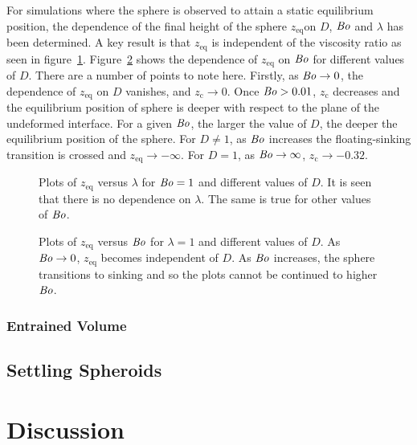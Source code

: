 \documentclass[12pt]{article}
\newcommand\Bo{\mbox{\textit{Bo}}}  %
\begin{document}
For simulations where the sphere is observed to attain a static equilibrium position, the dependence of the final height of the sphere $z_{\text{eq}}$on $D$, $\Bo$ and $\lambda$ has been determined. A key result is that $z_{\text{eq}}$ is independent of the viscosity ratio as seen in figure~\ref{fig:fin_pos_viscos}. Figure~\ref{fig:fin_pos} shows the dependence of $z_{\text{eq}}$ on $\Bo$ for different values of $D$. There are a number of points to note here. Firstly, as $\Bo \to 0$, the dependence of $z_{\text{eq}}$ on $D$ vanishes, and $z_{\text{c}} \to 0$. Once $\Bo > 0.01$, $z_{\text{c}}$ decreases and the equilibrium position of sphere is deeper with respect to the plane of the undeformed interface. For a given $\Bo$, the larger the value of $D$, the deeper the equilibrium position of the sphere. For $D \neq 1$, as $\Bo$ increases the floating-sinking transition is crossed and $z_{\text{eq}} \to -\infty$. For $D = 1$, as $\Bo \to \infty$, $z_{\text{c}} \to -0.32$. 

  \begin{figure}
    \resizebox{0.9\textwidth}{!}{\large }
    \caption{Plots of $z_{\text{eq}}$ versus $\lambda$ for $\Bo = 1$ and different values of $D$. It is seen that there is no dependence on $\lambda$. The same is true for other values of $\Bo$. \label{fig:fin_pos_viscos}}
  \end{figure}

  \begin{figure}
    \resizebox{0.9\textwidth}{!}{\large }
    \caption{Plots of $z_{\text{eq}}$ versus $\Bo$ for $\lambda = 1$ and different values of $D$. As $\Bo \to 0$, $z_{\text{eq}}$ becomes independent of $D$. As $\Bo$ increases, the sphere transitions to sinking and so the plots cannot be continued to higher $\Bo$. \label{fig:fin_pos}}
  \end{figure}

\subsubsection{Entrained Volume}
\label{subsubsec:ent_vol_res}


\subsection{Settling Spheroids}
\label{subsec:spheroids}


\section{Discussion}
\label{sec:discuss}
\end{document}
